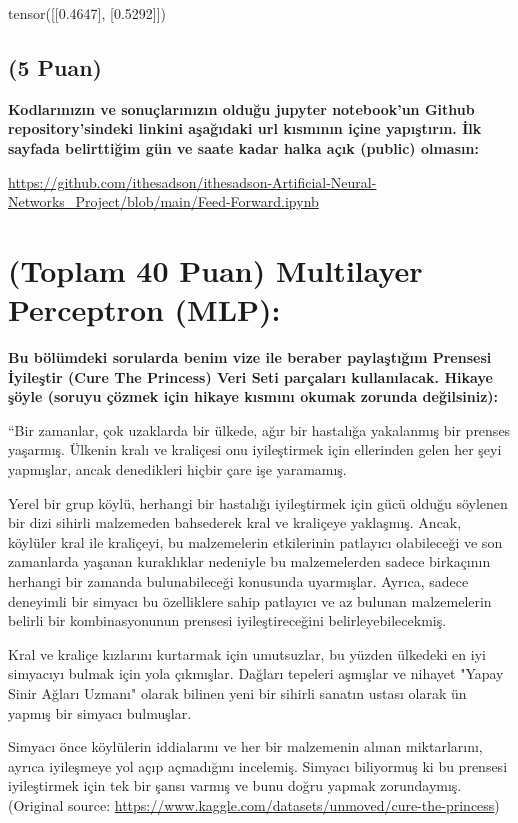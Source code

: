 \documentclass[11pt]{article}
\begin{document}
tensor([[0.4647],
        [0.5292]])
\subsection{(5 Puan)} \textbf{Kodlarınızın ve sonuçlarınızın olduğu jupyter notebook'un Github repository'sindeki linkini aşağıdaki url kısmının içine yapıştırın. İlk sayfada belirttiğim gün ve saate kadar halka açık (public) olmasın:}

\url{https://github.com/ithesadson/ithesadson-Artificial-Neural-Networks_Project/blob/main/Feed-Forward.ipynb}

\section{(Toplam 40 Puan) Multilayer Perceptron (MLP):} 
\textbf{Bu bölümdeki sorularda benim vize ile beraber paylaştığım Prensesi İyileştir (Cure The Princess) Veri Seti parçaları kullanılacak. Hikaye şöyle (soruyu çözmek için hikaye kısmını okumak zorunda değilsiniz):} 

``Bir zamanlar, çok uzaklarda bir ülkede, ağır bir hastalığa yakalanmış bir prenses yaşarmış. Ülkenin kralı ve kraliçesi onu iyileştirmek için ellerinden gelen her şeyi yapmışlar, ancak denedikleri hiçbir çare işe yaramamış.

Yerel bir grup köylü, herhangi bir hastalığı iyileştirmek için gücü olduğu söylenen bir dizi sihirli malzemeden bahsederek kral ve kraliçeye yaklaşmış. Ancak, köylüler kral ile kraliçeyi, bu malzemelerin etkilerinin patlayıcı olabileceği ve son zamanlarda yaşanan kuraklıklar nedeniyle bu malzemelerden sadece birkaçının herhangi bir zamanda bulunabileceği konusunda uyarmışlar. Ayrıca, sadece deneyimli bir simyacı bu özelliklere sahip patlayıcı ve az bulunan malzemelerin belirli bir kombinasyonunun prensesi iyileştireceğini belirleyebilecekmiş.

Kral ve kraliçe kızlarını kurtarmak için umutsuzlar, bu yüzden ülkedeki en iyi simyacıyı bulmak için yola çıkmışlar. Dağları tepeleri aşmışlar ve nihayet "Yapay Sinir Ağları Uzmanı" olarak bilinen yeni bir sihirli sanatın ustası olarak ün yapmış bir simyacı bulmuşlar.

Simyacı önce köylülerin iddialarını ve her bir malzemenin alınan miktarlarını, ayrıca iyileşmeye yol açıp açmadığını incelemiş. Simyacı biliyormuş ki bu prensesi iyileştirmek için tek bir şansı varmış ve bunu doğru yapmak zorundaymış. (Original source: \url{https://www.kaggle.com/datasets/unmoved/cure-the-princess})
\end{document}
